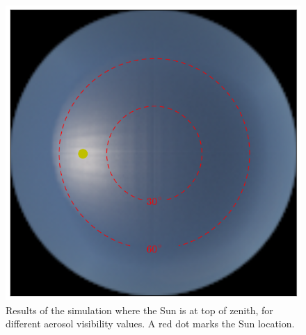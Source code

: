 \documentclass[10pt,twocolumn,letterpaper]{article}
\newcommand{\mat}[1]{\bm{#1}}
\begin{document}
%
%

\begin{figure}
 \includegraphics[width=\columnwidth]{images/ref_img34.png}
  \caption{Results of the simulation where the Sun is at top of
    zenith, for different aerosol visibility values. A red dot marks
    the Sun location.}
  \label{fig:simulation-results1}
\end{figure}
\end{document}
